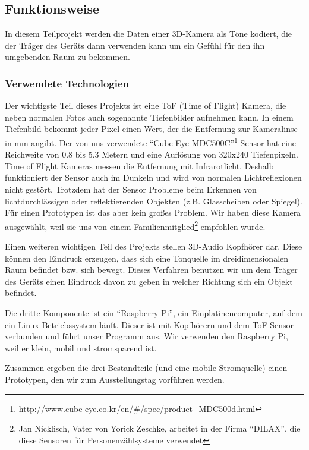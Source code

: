 \documentclass[a4paper,12pt,ngerman]{scrartcl}
\begin{document}
\subsection{Funktionsweise}

In diesem Teilprojekt werden die Daten einer 3D-Kamera als Töne kodiert, die der Träger des Geräts
dann verwenden kann um ein Gefühl für den ihn umgebenden Raum zu bekommen. 

\subsubsection{Verwendete Technologien}

Der wichtigste Teil dieses Projekts ist eine ToF (Time of Flight) Kamera, die neben normalen Fotos 
auch sogenannte Tiefenbilder aufnehmen kann.
In einem Tiefenbild bekommt jeder Pixel einen Wert, der die Entfernung zur Kameralinse in mm angibt.
Der von uns verwendete \enquote{Cube Eye MDC500C}\footnote{http://www.cube-eye.co.kr/en/\#/spec/product\_MDC500d.html}
Sensor hat eine Reichweite von 0.8 bis 5.3 Metern und eine Auflösung von 320x240 Tiefenpixeln. 
Time of Flight Kameras messen die Entfernung mit Infrarotlicht. Deshalb funktioniert der Sensor auch 
im Dunkeln und wird von normalen Lichtreflexionen nicht gestört. Trotzdem hat der Sensor Probleme beim
Erkennen von lichtdurchlässigen oder reflektierenden Objekten (z.B. Glasscheiben oder Spiegel). Für einen
Prototypen ist das aber kein großes Problem. Wir haben diese Kamera ausgewählt, weil sie uns von einem 
Familienmitglied\footnote{Jan Nicklisch, Vater von Yorick Zeschke, arbeitet in der Firma
	\enquote{DILAX}, die diese Sensoren für Personenzählsysteme verwendet} 
empfohlen wurde.\par
Einen weiteren wichtigen Teil des Projekts stellen 3D-Audio Kopfhörer dar. Diese können den Eindruck
erzeugen, dass sich eine Tonquelle im dreidimensionalen
Raum befindet bzw. sich bewegt. Dieses Verfahren benutzen wir um dem Träger des Geräts einen Eindruck
davon zu geben in welcher Richtung sich ein Objekt befindet.\par 
Die dritte Komponente ist ein \enquote{Raspberry Pi}, ein 
Einplatinencomputer, auf dem ein Linux-Betriebssystem läuft. Dieser ist mit Kopfhörern und dem ToF Sensor 
verbunden und führt unser Programm aus. Wir verwenden den Raspberry Pi, weil er klein, mobil und 
stromsparend ist.\par 
Zusammen ergeben die drei Bestandteile (und eine mobile Stromquelle) einen Prototypen, den wir zum Ausstellungstag vorführen werden.
\end{document}
